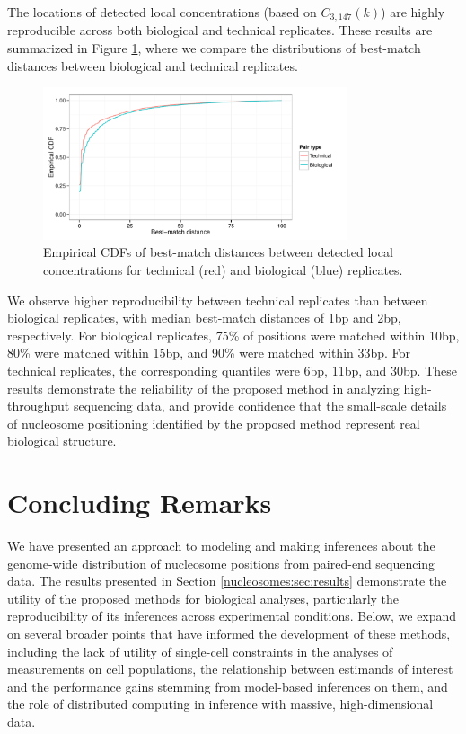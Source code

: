 The locations of detected local concentrations (based on $C_{3,147}(k)$) are highly reproducible across both biological and technical replicates.
These results are summarized in Figure \ref{nucleosomes:fig:localConcentrationReproducibility}, where we compare the distributions of best-match distances between biological and technical replicates.
%
\ifx\nofigures\undefined
\begin{figure}
 \centering
 \includegraphics[width=0.8\textwidth]{figures/nucleosomes/plot_reproducibility_cdfs_pm3}
 \caption{Empirical CDFs of best-match distances between detected local concentrations for technical (red) and biological (blue) replicates. \label{nucleosomes:fig:localConcentrationReproducibility}}
\end{figure}
\fi

We observe higher reproducibility between technical replicates than between biological replicates, with median best-match distances of 1bp and 2bp, respectively.
For biological replicates, 75\% of positions were matched within 10bp, 80\% were matched within 15bp, and 90\% were matched within 33bp.
For technical replicates, the corresponding quantiles were 6bp, 11bp, and 30bp.
These results demonstrate the reliability of the proposed method in analyzing high-throughput sequencing data, and provide confidence that the small-scale details of nucleosome positioning identified by the proposed method represent real biological structure.


\section{Concluding Remarks}
\label{nucleosomes:sec:remarks}

We have presented an approach to modeling and making inferences about the genome-wide distribution of nucleosome positions from paired-end sequencing data.
The results presented in Section \ref{nucleosomes:sec:results} demonstrate the utility of the proposed methods for biological analyses, particularly the reproducibility of its inferences across experimental conditions.
Below, we expand on several broader points that have informed the development of these methods, including
 the lack of utility of single-cell constraints in the analyses of measurements on cell populations, 
 the relationship between estimands of interest and the performance gains stemming from model-based inferences on them,
 and the role of distributed computing in inference with massive, high-dimensional data.

